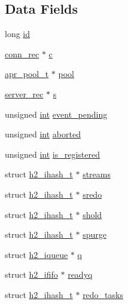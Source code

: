 \subsection*{Data Fields}
\begin{DoxyCompactItemize}
\item 
long \hyperlink{structh2__mplx_ad4333b2349dfe7ad35e42ca15dd51eb7}{id}
\item 
\hyperlink{structconn__rec}{conn\+\_\+rec} $\ast$ \hyperlink{structh2__mplx_ac63918b573f120f457787754cd79f263}{c}
\item 
\hyperlink{structapr__pool__t}{apr\+\_\+pool\+\_\+t} $\ast$ \hyperlink{structh2__mplx_a81f496a92c5d1825e554c1e24099d276}{pool}
\item 
\hyperlink{structserver__rec}{server\+\_\+rec} $\ast$ \hyperlink{structh2__mplx_a2bd28f0172c08c7d46f740b869b14734}{s}
\item 
unsigned \hyperlink{pcre_8txt_a42dfa4ff673c82d8efe7144098fbc198}{int} \hyperlink{structh2__mplx_ab1ec614c33e9287114f583de1493dba9}{event\+\_\+pending}
\item 
unsigned \hyperlink{pcre_8txt_a42dfa4ff673c82d8efe7144098fbc198}{int} \hyperlink{structh2__mplx_aa3ee90da5c50dc1eb7b05832be65abab}{aborted}
\item 
unsigned \hyperlink{pcre_8txt_a42dfa4ff673c82d8efe7144098fbc198}{int} \hyperlink{structh2__mplx_a1636f8fa7ff36c2b5994449111967560}{is\+\_\+registered}
\item 
struct \hyperlink{structh2__ihash__t}{h2\+\_\+ihash\+\_\+t} $\ast$ \hyperlink{structh2__mplx_a8b34fc7de9f06e5915dfec5e978bf57d}{streams}
\item 
struct \hyperlink{structh2__ihash__t}{h2\+\_\+ihash\+\_\+t} $\ast$ \hyperlink{structh2__mplx_a710245c8890d56e7466a854024f1c4b1}{sredo}
\item 
struct \hyperlink{structh2__ihash__t}{h2\+\_\+ihash\+\_\+t} $\ast$ \hyperlink{structh2__mplx_a4e1d525e731edba47768b8667f9116ab}{shold}
\item 
struct \hyperlink{structh2__ihash__t}{h2\+\_\+ihash\+\_\+t} $\ast$ \hyperlink{structh2__mplx_aaaab5fe587246e7bf275a317503b067c}{spurge}
\item 
struct \hyperlink{structh2__iqueue}{h2\+\_\+iqueue} $\ast$ \hyperlink{structh2__mplx_ad17f6957099ada646931069bda0239db}{q}
\item 
struct \hyperlink{structh2__ififo}{h2\+\_\+ififo} $\ast$ \hyperlink{structh2__mplx_a7823ff33cb1c7beb23a4ef658402789d}{readyq}
\item 
struct \hyperlink{structh2__ihash__t}{h2\+\_\+ihash\+\_\+t} $\ast$ \hyperlink{structh2__mplx_aef961a1479b93bdb15c960e5662e2af7}{redo\+\_\+tasks}

\end{DoxyCompactItemize}
